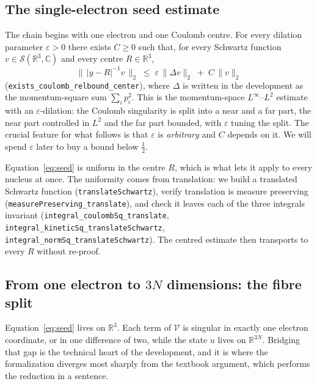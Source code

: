 \documentclass[aps,prd,reprint,nofootinbib,superscriptaddress]{revtex4-2}
\newcommand{\thm}[1]{\texttt{#1}}   %
\begin{document}
\subsection{The single-electron seed estimate}
\label{sec:seed}

The chain begins with one electron and one Coulomb centre. For every dilation parameter
$\varepsilon>0$ there exists $C\ge0$ such that, for every Schwartz function
$v\in\mathcal{S}(\mathbb{R}^{3},\mathbb{C})$ and every centre $R\in\mathbb{R}^{3}$,
\begin{equation}
\bigl\|\,|y-R|^{-1}v\,\bigr\|_{2}
\;\le\;
\varepsilon\,\bigl\|\Delta v\bigr\|_{2}
\;+\;
C\,\|v\|_{2}
\label{eq:seed}
\end{equation}
(\thm{exists\_coulomb\_relbound\_center}), where $\Delta$ is written in the development as the
momentum-square sum $\sum_{i}p_{i}^{2}$. This is the momentum-space $L^{\infty}$--$L^{2}$ estimate
with an $\varepsilon$-dilation: the Coulomb singularity is split into a near and a far part, the near
part controlled in $L^{2}$ and the far part bounded, with $\varepsilon$ tuning the split. The crucial
feature for what follows is that $\varepsilon$ is \emph{arbitrary} and $C$ depends on it. We will
spend $\varepsilon$ later to buy a bound below $\tfrac12$.

Equation~\eqref{eq:seed} is uniform in the centre $R$, which is what lets it apply to every nucleus
at once. The uniformity comes from translation: we build a translated Schwartz function
(\thm{translateSchwartz}), verify translation is measure preserving
(\thm{measurePreserving\_translate}), and check it leaves each of the three integrals invariant
(\thm{integral\_coulombSq\_translate}, \thm{integral\_kineticSq\_translateSchwartz},
\thm{integral\_normSq\_translateSchwartz}). The centred estimate then transports to every $R$ without
re-proof.

\subsection{From one electron to $3N$ dimensions: the fibre split}
\label{sec:fibre}

Equation~\eqref{eq:seed} lives on $\mathbb{R}^{3}$. Each term of $\mathcal{V}$ is singular in exactly
one electron coordinate, or in one difference of two, while the state $u$ lives on $\mathbb{R}^{3N}$.
Bridging that gap is the technical heart of the development, and it is where the formalization
diverges most sharply from the textbook argument, which performs the reduction in a sentence.
\end{document}
